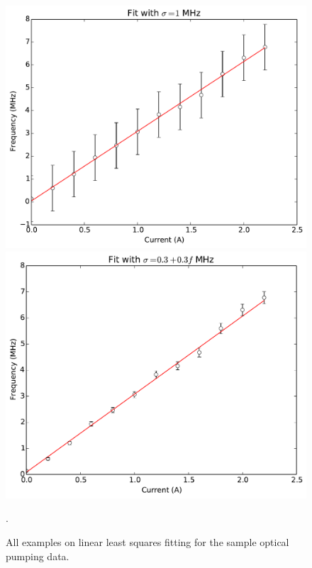 \documentclass[11pt,letterpaper]{article}
\begin{document}
\begin{figure}
    \begin{minipage}[t]{0.45\textwidth}
        \centering
        \includegraphics[width=\textwidth]{figures/problem5_3.pdf}
    \end{minipage}
    \hspace{0.5cm}
    \begin{minipage}[t]{0.45\textwidth}
        \centering
        \includegraphics[width=\textwidth]{figures/problem5_4.pdf}
    \end{minipage}
    \caption{All examples on linear least squares fitting for the sample optical
    pumping data.}
    \label{optical}.
\end{figure}
\end{document}
